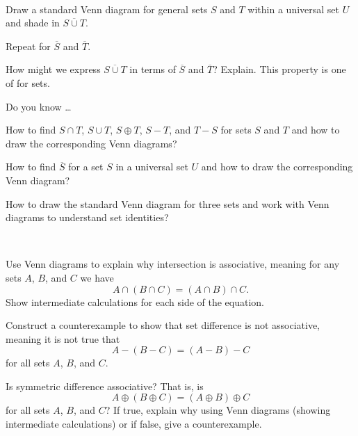 \begin{exer}[\exerU] %
\label{exer_set_demorgan}
~
    \begin{exerpart}
        \item Draw a standard Venn diagram for general sets $S$ and $T$ within a universal set $U$ and shade in $\overline{S \cup T}$. 
        \item Repeat for $\overline{S}$ and $\overline{T}$.
        \item How might we express $\overline{S \cup T}$ in terms of $\overline{S}$ and $\overline{T}$?  Explain. This property is one of  for sets.
    \end{exerpart}\end{exer}

\begin{exer}[\exerR] %
\label{exer_dyk_set_ops}
    Do you know \ldots
        \begin{exerpart}
            \item How to find $S \cap T$, $S \cup T$, $S \oplus T$, $S - T$, and $T-S$ for sets $S$ and $T$ and how to draw the corresponding Venn diagrams?
            \item How to find $\overline{S}$ for a set $S$ in a universal set $U$ and how to draw the corresponding Venn diagram?
            \item How to draw the standard Venn diagram for three sets and work with Venn diagrams to understand set identities? 
        \end{exerpart}
\end{exer}

\begin{exer}[\exerE] %
\label{exer_assoc_ppty_sets}
~
    \begin{exerpart}
        \item Use Venn diagrams to explain why intersection is associative, meaning for any sets $A$, $B$, and $C$ we have
        $$A \cap (B \cap C) = (A \cap B) \cap C.$$
        Show intermediate calculations for each side of the equation.
        \item Construct a counterexample to show that set difference is not associative, meaning it is not true that $$A - (B - C) = (A - B) - C$$ for all sets $A$, $B$, and $C$.
        \item Is symmetric difference associative?  That is, is $$A \oplus (B \oplus C) = (A \oplus B) \oplus C$$ for all sets $A$, $B$, and $C$?  If true, explain why using Venn diagrams (showing intermediate calculations) or if false, give a counterexample.
        \end{exerpart}
\end{exer}


